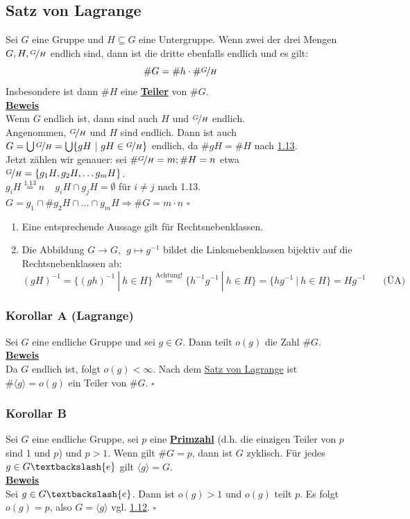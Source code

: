 \documentclass[a4paper, pagesize=pdftex, pdftex, twoside, headsepline, index=totoc,toc=listof, fontsize=10pt, cleardoublepage=empty, headinclude, DIV=13, BCOR=13mm]{scrartcl}
\newcommand{\bet}[1]{\uline{\textbf{#1}}} %
\newcommand{\Index}[1]{\uline{\textbf{#1}}\index{#1}} %
\newcommand{\lh}[1]{\langle #1 \rangle} %
\begin{document}
\subsection{Satz von Lagrange}
\label{sub:satz_von_lagrange}
Sei $G$ eine Gruppe und $H\subseteq G$ eine Untergruppe. Wenn zwei der drei Mengen $G,H,\nicefrac{G}{H}$ endlich sind, dann ist die dritte ebenfalls endlich und es gilt:\\
\[\#G=\#h \cdot \#\nicefrac{G}{H} \]
Insbesondere ist dann $\#H$ eine \Index{Teiler} von $\#G$.\\
\vfill
\bet{Beweis}\\
Wenn $G$ endlich ist, dann sind auch $H$ und $\nicefrac{G}{H}$ endlich.\\
Angenommen, $\nicefrac{G}{H}$ und $H$ sind endlich. Dann ist auch $G= \bigcup \nicefrac{G}{H}=\bigcup\{gH~|~gH\in \nicefrac{G}{H} \}$ endlich, da $\#gH=\#H$ nach \hyperref[sub:nebenklassen]{1.13}.\\
Jetzt zählen wir genauer: sei $\#\nicefrac{G}{H}=m; \#H=n$ etwa $\nicefrac{G}{H}=\{g_1H,g_2H,\dots g_mH \}$.\\
$g_iH\stackrel{1.13}{=}n~~~~~g_iH\cap g_jH=\emptyset$ für $i\not=j$ nach 1.13.\\
$G=g_1\cap \#g_2H\cap \dots \cap g_mH \Rightarrow \#G=m\cdot n$
\hfill $\square$

\begin{enumerate}[(1)]
	\item Eine entsprechende Aussage gilt für Rechtsnebenklassen.
	\item Die Abbildung $G \to G,~~g\mapsto g^{-1}$ bildet die Linksnebenklassen bijektiv auf die Rechtsnebenklassen ab:
	\[
	(gH)^{-1}=\{(gh)^{-1}~|~h \in H \} \stackrel{\text{Achtung!}}{=}\{h^{-1}g^{-1}~|~h \in H \}=\{hg^{-1}~|~h\in H \}=Hg^{-1}~~~~~~~~\text{(ÜA)}
	\]
\end{enumerate}

\subsubsection*{Korollar A (Lagrange)}
Sei $G$ eine endliche Gruppe und sei $g\in G$. Dann teilt $o(g)$ die Zahl $\#G$.\\
\bet{Beweis}\\
Da $G$ endlich ist, folgt $o(g)<\infty$. Nach dem \hyperref[sub:satz_von_lagrange]{Satz von Lagrange} ist $\#\lh{g}=o(g)$ ein Teiler von $\#G$.
\hfill $\square$

\subsubsection*{Korollar B}
Sei $G$ eine endliche Gruppe, sei $p$ eine \Index{Primzahl}  (d.h. die einzigen Teiler von $p$ sind 1 und $p$) und $p>1$. Wenn gilt $\#G=p$, dann ist $G$ zyklisch. Für jedes $g\in G \textbackslash\{e\}$ gilt $\lh{g}=G$.\\
\bet{Beweis}\\
Sei $g \in G\textbackslash\{e\}$. Dann ist $o(g)>1$ und $o(g)$ teilt $p$. Es folgt $o(g)=p$, also $G=\lh{g}$ vgl. \hyperref[sub:zyklische_gruppen]{1.12}.
\hfill $\square$
\end{document}
